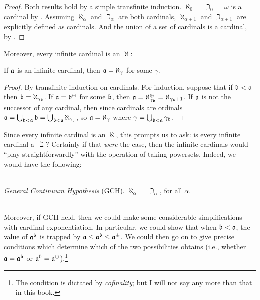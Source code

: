 \documentclass[../../../include/open-logic-section]{subfiles}
\begin{document}
\begin{proof}
Both results hold by a simple transfinite induction. $\aleph_0 =
\beth_0 = \omega$ is a cardinal by
. Assuming $\aleph_\alpha$ and
$\beth_\alpha$ are both cardinals, $\aleph_{\alpha+1}$ and
$\beth_{\alpha+1}$ are explicitly defined as cardinals. And the union
of a set of cardinals is a cardinal, by
.
\end{proof}

Moreover, every infinite cardinal is an $\aleph$:

\begin{prop}
If $\mathfrak{a}$ is an infinite cardinal, then $\mathfrak{a} =
\aleph_\gamma$ for some $\gamma$.
\end{prop}

\begin{proof}
By transfinite induction on cardinals. For induction, suppose that if
$\mathfrak{b} < \mathfrak{a}$ then $\mathfrak{b} =
\aleph_{\gamma_{\mathfrak{b}}}$. If $\mathfrak{a} =
\mathfrak{b}^{\oplus}$ for some $\mathfrak{b}$, then $\mathfrak{a} =
\aleph_{\gamma_{\mathfrak{b}}}^{\oplus}=
\aleph_{\gamma_{\mathfrak{b}}+1}$. If $\mathfrak{a}$ is not the
successor of any cardinal, then since cardinals are ordinals
$\mathfrak{a} = \bigcup_{\mathfrak{b} < \mathfrak{a}} \mathfrak{b} =
\bigcup_{\mathfrak{b} < \mathfrak{a}}{\aleph_{\gamma_{\mathfrak{b}}}}$,
so $\mathfrak{a} = \aleph_\gamma$ where $\gamma =
\bigcup_{\mathfrak{b} < \mathfrak{a}}\gamma_{\mathfrak{b}}$. 
\end{proof}

Since every infinite cardinal is an $\aleph$, this prompts us to ask:
is every infinite cardinal a~$\beth$? Certainly if that \emph{were}
the case, then the infinite cardinals would ``play straightforwardly''
with the operation of taking powersets. Indeed, we would have the
following:

\
\\\emph{General Continuum Hypothesis} (GCH). $\aleph_\alpha  = \beth_\alpha$, for all $\alpha$. 

\
\\Moreover, if GCH held, then we could make some considerable
simplifications with cardinal exponentiation. In particular, we could
show that when $\mathfrak{b} < \mathfrak{a}$, the value of
$\mathfrak{a}^{\mathfrak{b}}$ is trapped by
$\mathfrak{a}\leq \mathfrak{a}^{\mathfrak{b}} \leq
\mathfrak{a}^{\oplus}$. We could then go on to give precise
conditions which determine which of the two possibilities obtains
(i.e., whether $\mathfrak{a} = \mathfrak{a}^{\mathfrak{b}}$
or $\mathfrak{a}^{\mathfrak{b}} =
\mathfrak{a}^{\oplus}$).\footnote{The condition is dictated by
\emph{cofinality}; but I will not say any more than that in this
book.}
\end{document}
